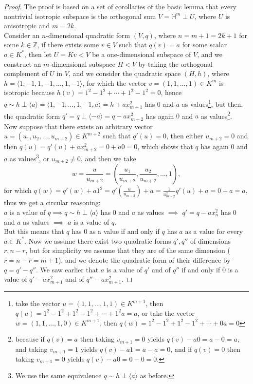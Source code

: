 \documentclass{article}
\begin{document}
\begin{proof}
The proof is based on a set of corollaries of the basic lemma that every nontrivial isotropic subspace is the orthogonal sum $V=\mathbb{H}^m\perp{U}$, where $U$ is anisotropic and $m=2k$.\\
Consider an $n$-dimensional quadratic form $(V,q)$, where $n=m+1=2k+1$ for some $k\in\mathbb{Z}$, if there exists some $v\in{V}$ such that $q(v)=a$ for some scalar $a\in{K}^{\ast}$, then let $U=Kv<V$ be a one-dimensional subspace of $V$, and we construct an $m$-dimensional subspace $H<V$ by taking the orthogonal complement of $U$ in $V$, and we consider the quadratic space $(H,h)$, where $h=\langle1,-1,1,-1,\dots,1,-1\rangle$, for which the vector $v=(1,1,\dots,1)\in{K}^m$ is isotropic because $h(v)=1^2-1^2+\cdots+1^2-1^2=0$, hence $q\sim{h}\perp\langle{a}\rangle=\langle1,-1,\dots,1,-1,a\rangle=h+ax_{m+1}^2$ has $0$ and $a$ as values\footnote{take the vector $u=(1,1,\dots,1,1)\in{K}^{m+1}$, then $q(u)=1^2-1^2+1^2-1^2+\cdots+1^2a=a$, or take the vector $w=(1,1,\dots,1,0)\in{K}^{m+1}$, then $q(w)=1^2-1^2+1^2-1^2+\cdots+0a=0$}, but then, the quadratic form $q'=q\perp\langle-a\rangle=q-ax_{m+2}^2$ has again $0$ and $a$ as values\footnote{because if  $q(v)=a$ then taking $v_{m+1}=0$ yields $q(v)-a0=a-0=a$, and taking $v_{m+1}=1$ yields $q(v)-a1=a-a=0$, and if $q(v)=0$ then taking $v_{m+1}=0$ yields $q(v)-a0=0-0=0$.}.\\
Now suppose that there exists an arbitrary vector $u=(u_1,u_2,\dots,u_{m+2})\in{K}^{m+2}$ such that $q'(u)=0$, then either $u_{m+2}=0$ and then $q(u)=q'(u)+ax_{m+2}^2=0+a0=0$, which shows that $q$ has again $0$ and $a$ as values\footnote{We use the same equivalence $q\sim{h}\perp\langle{a}\rangle$ as before.}, or $u_{m+2}\neq0$, and then we take \[w=\frac{u}{u_{m+2}}=(\frac{u_1}{u_{m+2}},\frac{u_2}{u_{m+2}},\dots,1),\]
for which $q(w)=q'(w)+a1^2=q'(\frac{u}{u_{m+2}})+a=\frac{1}{u_{m+2}^2}q'(u)+a=0+a=a$, thus we get a circular reasoning:\\ $a$ is a value of $q\implies{q}\sim{h}\perp\langle{a}\rangle$ has $0$ and $a$ as values $\implies$ $q'=q-ax_{n}^2$ has $0$ and $a$ as values $\implies$ $a$ is a value of $q$.\\
But this means that $q$ has $0$ as a value if and only if $q$ has $a$ as a value for every $a\in{K}^{\ast}$.
Now we assume there exist two quadratic forms $q',q''$ of dimensions $r,n-r$, but for simplicity we assume that they are of the same dimension ($r=n-r=m+1$), and we denote the quadratic form of their difference by $q=q'-q''$. We saw earlier that $a$ is a value of $q'$ and of $q''$ if and only if $0$ is a value of $q'-ax_{m+1}^2$ and of $q''-ax_{m+1}^2$.

\end{proof}
\end{document}
